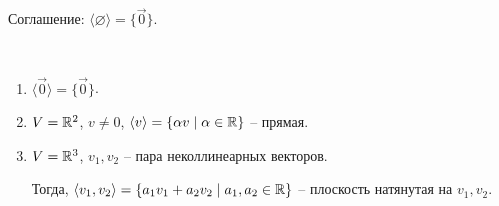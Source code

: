Соглашение: $\langle \varnothing \rangle = \{\overrightarrow{0}\}$.

\begin{example}~
    \begin{enumerate}
    \item
        $\langle \overrightarrow{0} \rangle = \{\overrightarrow{0}\}$.
    \item
        $V = \mathbb{R}^2$, $v \neq 0$, $\langle v \rangle = \{\alpha v \mid \alpha \in \mathbb{R}\}$ -- прямая.
    \item
        $V = \mathbb{R}^3$, $v_1, v_2$ -- пара неколлинеарных векторов.

        Тогда, $\langle v_1, v_2 \rangle = \{a_1 v_1 + a_2 v_2 \mid a_1, a_2 \in \mathbb{R}\}$ -- плоскость натянутая на $v_1, v_2$.
    \end{enumerate}
\end{example}

